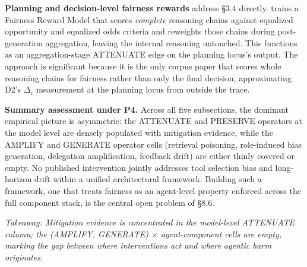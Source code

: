 \documentclass[acmsmall,nonacm]{acmart}
\begin{document}
\textbf{Planning and decision-level fairness rewards} address \S{}3.4 directly. \cite{hall2025guiding} trains a Fairness Reward Model that scores \emph{complete} reasoning chains against equalized opportunity and equalized odds criteria and reweights those chains during post-generation aggregation, leaving the internal reasoning untouched. This functions as an aggregation-stage ATTENUATE edge on the planning locus's output. The approach is significant because it is the only corpus paper that scores whole reasoning chains for fairness rather than only the final decision, approximating D2's $\Delta_c$ measurement at the planning locus from outside the trace.

\textbf{Summary assessment under P4.} Across all five subsections, the dominant empirical picture is asymmetric: the ATTENUATE and PRESERVE operators at the model level are densely populated with mitigation evidence, while the AMPLIFY and GENERATE operator cells (retrieval poisoning, role-induced bias generation, delegation amplification, feedback drift) are either thinly covered or empty. No published intervention jointly addresses tool selection bias and long-horizon drift within a unified architectural framework. Building such a framework, one that treats fairness as an agent-level property enforced across the full component stack, is the central open problem of \S{}8.6.


\emph{Takeaway: Mitigation evidence is concentrated in the model-level ATTENUATE column; the (AMPLIFY, GENERATE) $\times$ agent-component cells are empty, marking the gap between where interventions act and where agentic harm originates.}
\end{document}
